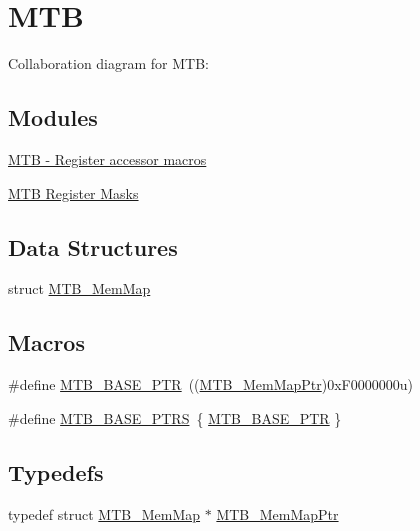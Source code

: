 \hypertarget{group___m_t_b___peripheral}{}\section{M\+TB}
\label{group___m_t_b___peripheral}
Collaboration diagram for M\+TB\+:
\subsection*{Modules}
\begin{DoxyCompactItemize}
\item 
\hyperlink{group___m_t_b___register___accessor___macros}{M\+T\+B -\/ Register accessor macros}
\item 
\hyperlink{group___m_t_b___register___masks}{M\+T\+B Register Masks}
\end{DoxyCompactItemize}
\subsection*{Data Structures}
\begin{DoxyCompactItemize}
\item 
struct \hyperlink{struct_m_t_b___mem_map}{M\+T\+B\+\_\+\+Mem\+Map}
\end{DoxyCompactItemize}
\subsection*{Macros}
\begin{DoxyCompactItemize}
\item 
\#define \hyperlink{group___m_t_b___peripheral_gadf7f362dfa67354951e6a23ddf08cd73}{M\+T\+B\+\_\+\+B\+A\+S\+E\+\_\+\+P\+TR}~((\hyperlink{group___m_t_b___peripheral_ga2d3d13148d5c08e92b1ad2eeb14342da}{M\+T\+B\+\_\+\+Mem\+Map\+Ptr})0x\+F0000000u)
\item 
\#define \hyperlink{group___m_t_b___peripheral_ga45b3138a9794fd8f2c7613b48646e44f}{M\+T\+B\+\_\+\+B\+A\+S\+E\+\_\+\+P\+T\+RS}~\{ \hyperlink{group___m_t_b___peripheral_gadf7f362dfa67354951e6a23ddf08cd73}{M\+T\+B\+\_\+\+B\+A\+S\+E\+\_\+\+P\+TR} \}
\end{DoxyCompactItemize}
\subsection*{Typedefs}
\begin{DoxyCompactItemize}
\item 
typedef struct \hyperlink{struct_m_t_b___mem_map}{M\+T\+B\+\_\+\+Mem\+Map} $\ast$ \hyperlink{group___m_t_b___peripheral_ga2d3d13148d5c08e92b1ad2eeb14342da}{M\+T\+B\+\_\+\+Mem\+Map\+Ptr}
\end{DoxyCompactItemize}


